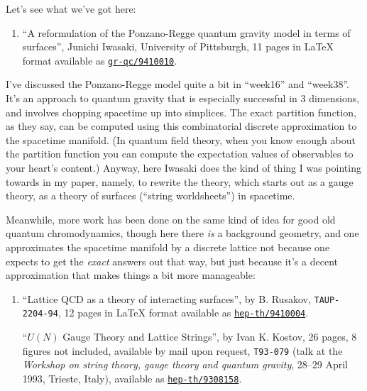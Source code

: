 \documentclass{article}
\def\tightlist{}
\begin{document}
Let's see what we've got here:

\begin{enumerate}
\def\labelenumi{\arabic{enumi})}
\setcounter{enumi}{9}
\tightlist
\item
  ``A reformulation of the Ponzano-Regge quantum gravity model in terms
  of surfaces'', Junichi Iwasaki, University of Pittsburgh, 11 pages in
  LaTeX format available as
  \href{http://xxx.lanl.gov/abs/gr-qc/9410010}{\texttt{gr-qc/9410010}}.
\end{enumerate}

I've discussed the Ponzano-Regge model quite a bit in ``week16'' and
``week38''. It's an approach to quantum gravity that is especially
successful in 3 dimensions, and involves chopping spacetime up into
simplices. The exact partition function, as they say, can be computed
using this combinatorial discrete approximation to the spacetime
manifold. (In quantum field theory, when you know enough about the
partition function you can compute the expectation values of observables
to your heart's content.) Anyway, here Iwasaki does the kind of thing I
was pointing towards in my paper, namely, to rewrite the theory, which
starts out as a gauge theory, as a theory of surfaces (``string
worldsheets'') in spacetime.

Meanwhile, more work has been done on the same kind of idea for good old
quantum chromodynamics, though here there \emph{is} a background
geometry, and one approximates the spacetime manifold by a discrete
lattice not because one expects to get the \emph{exact} answers out that
way, but just because it's a decent approximation that makes things a
bit more manageable:

\begin{enumerate}
\def\labelenumi{\arabic{enumi})}
\setcounter{enumi}{10}
\item
  ``Lattice QCD as a theory of interacting surfaces'', by B. Rusakov,
  \texttt{TAUP-2204-94}, 12 pages in LaTeX format available as
  \href{http://xxx.lanl.gov/abs/hep-th/9410004}{\texttt{hep-th/9410004}}.

  ``\(U(N)\) Gauge Theory and Lattice Strings'', by Ivan K. Kostov, 26
  pages, 8 figures not included, available by mail upon request,
  \texttt{T93-079} (talk at the \emph{Workshop on string theory, gauge
  theory and quantum gravity}, 28--29 April 1993, Trieste, Italy),
  available as
  \href{http://xxx.lanl.gov/abs/hep-th/9308158}{\texttt{hep-th/9308158}}.
\end{enumerate}
\end{document}
